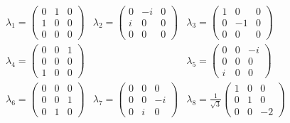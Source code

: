 \begin{eqnarray*}
  \lambda_1 = \left(
  \begin{array}{ccc}
    0 & 1 & 0 \\
    1 & 0 & 0 \\
    0 & 0 & 0
  \end{array}
  \right)
  &
  \lambda_2 = \left(
  \begin{array}{ccc}
    0 & -i & 0 \\
    i & 0 & 0 \\
    0 & 0 & 0
  \end{array}
  \right)
  &
  \lambda_3 = \left(
  \begin{array}{ccc}
    1 & 0 & 0 \\
    0 & -1 & 0 \\
    0 & 0 & 0
  \end{array}
  \right)
  \\
  \lambda_4 = \left(
  \begin{array}{ccc}
    0 & 0 & 1 \\
    0 & 0 & 0 \\
    1 & 0 & 0
  \end{array}
  \right)
  &
  &
  \lambda_5 = \left(
  \begin{array}{ccc}
    0 & 0 & -i \\
    0 & 0 & 0 \\
    i & 0 & 0
  \end{array}
  \right)
  \\
  \lambda_6 = \left(
  \begin{array}{ccc}
    0 & 0 & 0 \\
    0 & 0 & 1 \\
    0 & 1 & 0
  \end{array}
  \right)
  &
  \lambda_7 = \left(
  \begin{array}{ccc}
    0 & 0 & 0 \\
    0 & 0 & -i \\
    0 & i & 0
  \end{array}
  \right)
  &
  \lambda_8 = \frac{1}{\sqrt{3}}\left(
  \begin{array}{ccc}
    1 & 0 & 0 \\
    0 & 1 & 0 \\
    0 & 0 & -2
  \end{array}
  \right)
\end{eqnarray*}

